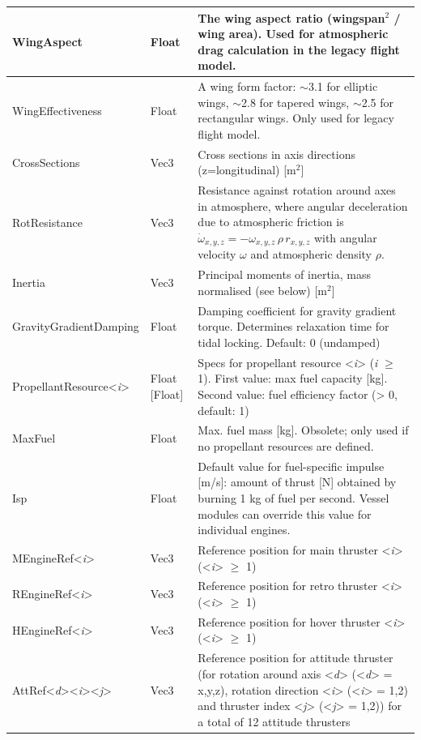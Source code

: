 \documentclass[Orbiter Developer Manual.tex]{subfiles}
\begin{document}
\begin{longtable}{ |p{}|p{}|p{}| }
	\hline\rule{0pt}{2ex}
	WingAspect & Float & The wing aspect ratio (wingspan$^{2}$ / wing area). Used for atmospheric drag calculation in the legacy flight model.\\
	\hline\rule{0pt}{2ex}
	WingEffectiveness & Float & A wing form factor: $\sim$3.1 for elliptic wings, $\sim$2.8 for tapered wings, $\sim$2.5 for rectangular wings. Only used for legacy flight model.\\
	\hline\rule{0pt}{2ex}
	CrossSections & Vec3 & Cross sections in axis directions (z=longitudinal) [m$^{2}$]\\
	\hline\rule{0pt}{2ex}
	RotResistance & Vec3 & Resistance against rotation around axes in atmosphere, where angular deceleration due to atmospheric friction is $\dot{\omega}_{x,y,z} = -\omega_{x,y,z} \, \rho \, r_{x,y,z}$ with angular velocity $\omega$ and atmospheric density $\rho$.\\
	\hline\rule{0pt}{2ex}
	Inertia & Vec3 & Principal moments of inertia, mass normalised (see below) [m$^{2}$]\\
	\hline\rule{0pt}{2ex}
	GravityGradientDamping & Float & Damping coefficient for gravity gradient torque. Determines relaxation time for tidal locking. Default: 0 (undamped)\\
	\hline\rule{0pt}{2ex}
	PropellantResource<\textit{i}> & Float [Float] & Specs for propellant resource <\textit{i}> (\textit{i} $\geq$ 1). First value: max fuel capacity [kg]. Second value: fuel efficiency factor (> 0, default: 1)\\
	\hline\rule{0pt}{2ex}
	MaxFuel & Float & Max. fuel mass [kg]. Obsolete; only used if no propellant resources are defined.\\
	\hline\rule{0pt}{2ex}
	Isp & Float & Default value for fuel-specific impulse [m/s]: amount of thrust [N] obtained by burning 1 kg of fuel per second. Vessel modules can override this value for individual engines.\\
	\hline\rule{0pt}{2ex}
	MEngineRef<\textit{i}> & Vec3 & Reference position for main thruster <\textit{i}> (<\textit{i}> $\geq$ 1)\\
	\hline\rule{0pt}{2ex}
	REngineRef<\textit{i}> & Vec3 & Reference position for retro thruster <\textit{i}> (<\textit{i}> $\geq$ 1)\\
	\hline\rule{0pt}{2ex}
	HEngineRef<\textit{i}> & Vec3 & Reference position for hover thruster <\textit{i}> (<\textit{i}> $\geq$ 1)\\
	\hline\rule{0pt}{2ex}
	AttRef<\textit{d}><\textit{i}><\textit{j}> & Vec3 & Reference position for attitude thruster (for rotation around axis <\textit{d}> (<\textit{d}> = x,y,z), rotation direction <\textit{i}> (<\textit{i}> = 1,2) and thruster index <\textit{j}> (<\textit{j}> = 1,2)) for a total of 12 attitude thrusters\\

\end{longtable}
\end{document}
